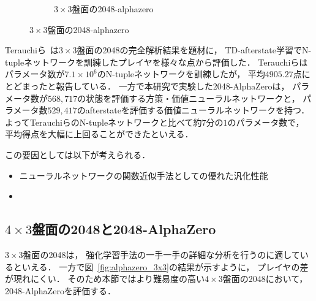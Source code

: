 \begin{figure}
\begin{subfigure}[T]{0.5\columnwidth}
        \caption{$3\times3$盤面の2048-alphazero}
        \label{fig:mini2048_alphazero_simulations}
    \end{subfigure}
\end{figure}

Terauchiら~\cite{Min2048_matsuzaki}は$3\times3$盤面の2048の完全解析結果を題材に， TD-afterstate学習でN-tupleネットワークを訓練したプレイヤを様々な点から評価した．
Terauchiらはパラメータ数が$7.1\times{10}^6$のN-tupleネットワークを訓練したが， 平均$4905.27$点にとどまったと報告している．
一方で本研究で実験した2048-AlphaZeroは， パラメータ数が$568,717$の状態を評価する方策・価値ニューラルネットワークと， パラメータ数$529,417$のafterstateを評価する価値ニューラルネットワークを持つ．
よってTerauchiらのN-tupleネットワークと比べて約$7$分の$1$のパラメータ数で， 平均得点を大幅に上回ることができたといえる．

この要因としては以下が考えられる．
\begin{itemize}
    \item ニューラルネットワークの関数近似手法としての優れた汎化性能
    \item 
\end{itemize}

\subsection{$4\times3$盤面の2048と2048-AlphaZero}
$3\times3$盤面の2048は， 強化学習手法の一手一手の詳細な分析を行うのに適しているといえる．
一方で図~\ref{fig:alphazero_3x3}の結果が示すように， プレイヤの差が現れにくい．
そのため本節ではより難易度の高い$4\times3$盤面の2048において， 2048-AlphaZeroを評価する．